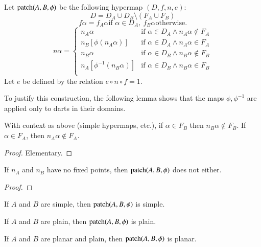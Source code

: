 \begin{definition} Let ${\operatorname{patch}}(A,B,\phi)$ be the following hypermap
$(D,f,n,e)$:
    $$D = D_A \cup D_B \setminus (F_A\cup F_B)$$
    $$f\alpha = f_A\alpha \text{if } \alpha\in D_A, \ f_B\alpha
    \text{otherwise}.
    $$
    $$n\alpha = \begin{cases}
    n_A\alpha &
        \text{if } \alpha\in D_A \wedge n_A\alpha\not\in F_A\\
    n_B[\phi(n_A\alpha)] &
        \text{if } \alpha\in D_A \wedge n_A\alpha\in F_A\\
    n_B\alpha &
        \text{if } \alpha\in D_B \wedge n_B\alpha\not\in F_B\\
    n_A[\phi^{-1}(n_B \alpha)] &
        \text{if } \alpha\in D_B \wedge n_B\alpha\in F_B\\
    \end{cases}
    $$
Let $e$ be defined by the relation $e\circ n\circ f = 1$.
\end{definition}

To justify this construction, the following lemma shows that the
maps $\phi,\phi^{-1}$ are applied only to darts in their domains.

\begin{lemma} With context as above (simple hypermaps, etc.),
if $\alpha\in F_B$ then $n_B\alpha\not\in F_B$.  If $\alpha\in
F_A$, then $n_A\alpha\not\in F_A$.
\end{lemma}

\begin{proof} Elementary.
\end{proof}

\begin{lemma} If $n_A$ and $n_B$ have no fixed points, then
    ${\operatorname{patch}}(A,B,\phi)$ does not either.
\end{lemma}

\begin{proof}
\end{proof}

\begin{lemma} If $A$ and $B$ are simple, then
${\operatorname{patch}}(A,B,\phi)$ is simple.
\end{lemma}

\begin{lemma} If $A$ and $B$ are plain, then
${\operatorname{patch}}(A,B,\phi)$ is plain.
\end{lemma}

\begin{lemma} If $A$ and $B$ are planar and plain, then
    ${\operatorname{patch}}(A,B,\phi)$ is planar.
\end{lemma}
